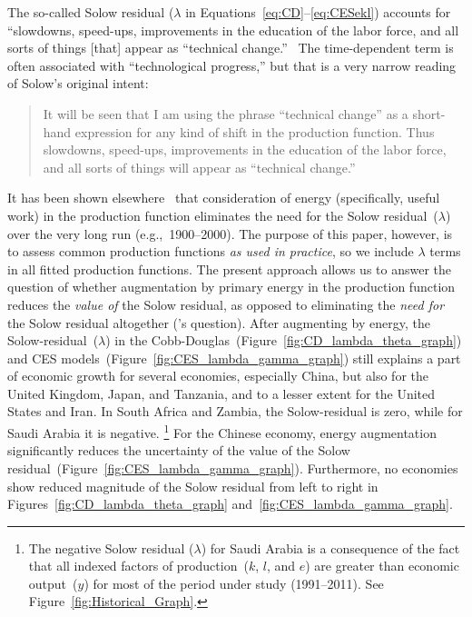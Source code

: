 \documentclass[preprint,authoryear,12pt]{elsarticle}\usepackage[]{graphicx}\usepackage[]{color}
\begin{document}
The so-called Solow residual ($\lambda$ in Equations~\ref{eq:CD}--\ref{eq:CESekl}) 
accounts for “slowdowns, speed-ups, improvements in the education of the labor force, 
and all sorts of things [that] appear as ``technical change.''~\citep{solow1957technical} 
The time-dependent term is often associated with
``technological progress,'' but that is a very narrow reading of Solow's original intent:
  \begin{quote}
    It will be seen that I am using the phrase ``technical change''
    as a short-hand expression for any kind of shift 
    in the production function. 
    Thus slowdowns, speed-ups, improvements in the education of the labor force, 
    and all sorts of things will appear as ``technical change.''~\citep{solow1957technical}
  \end{quote}

It has been shown elsewhere~\citep{Ayres:2010ug}
that consideration of energy (specifically, useful work) 
in the production function eliminates the need for the Solow residual~($\lambda$) 
over the very long run (e.g.,~1900--2000). 
The purpose of this paper, however, is to assess common production functions \emph{as used in practice}, 
so we include $\lambda$ terms in all fitted production functions. 
The present approach allows us to answer the question of whether augmentation by 
primary energy in the production function reduces the \emph{value of} the Solow residual,
as opposed to eliminating the \emph{need for} the Solow residual altogether 
(\citeauthor{Ayres:2010ug}'s question).
After augmenting by energy, the Solow-residual~($\lambda$) 
in the Cobb-Douglas~(Figure~\ref{fig:CD_lambda_theta_graph}) 
and CES models~(Figure~\ref{fig:CES_lambda_gamma_graph}) 
still explains a part of economic growth for several economies, 
especially China, but also for the United Kingdom, Japan, and Tanzania,  
and to a lesser extent for the United States and Iran. 
In South Africa and Zambia, the Solow-residual is zero, while for Saudi Arabia it is negative.%
  \footnote{
  The negative Solow residual ($\lambda$) for Saudi Arabia is a consequence
  of the fact that all indexed factors of production~($k$, $l$, and $e$) are greater than 
  economic output~($y$) for most of the period under study (1991--2011).
  See Figure~\ref{fig:Historical_Graph}.
  }
For the Chinese economy, energy augmentation significantly reduces 
the uncertainty of the value of the Solow residual~(Figure~\ref{fig:CES_lambda_gamma_graph}). 
Furthermore, no economies show reduced magnitude of the Solow residual from left to right
in Figures~\ref{fig:CD_lambda_theta_graph} and~\ref{fig:CES_lambda_gamma_graph}.
\end{document}
